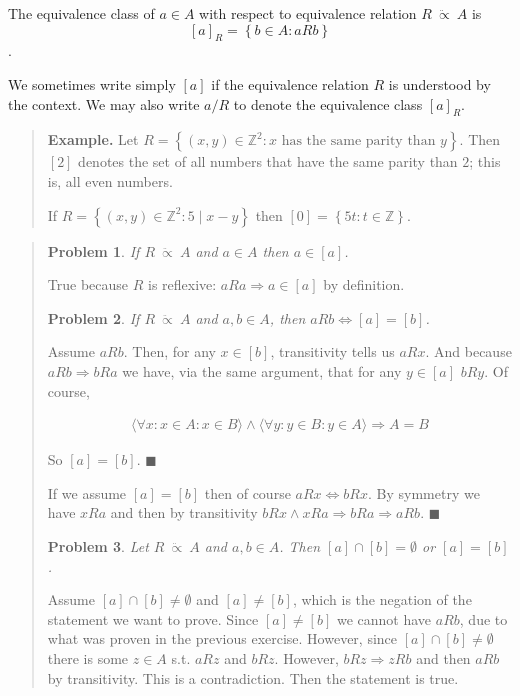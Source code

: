 \documentclass[a4paper, 12pt]{article}
\newtheorem{problem}{Problem}
\newtheorem{problem}{Problem}
\begin{document}
\begin{definition}
    The equivalence class of $a \in A$ with respect to equivalence relation $R ~
    \ddot{\propto} ~A$ is $$[a]_{R} = \left\{ b \in A : aRb \right\} $$.
\end{definition}

We sometimes write simply $[a]$ if the equivalence relation $R$ is understood by
the context. We may also write $a / R$ to denote the equivalence class $[a]_R$.


\small
\begin{quote}

\textbf{Example.} Let $R = \left\{ (x, y) \in \mathbb{Z}^2 : x \text{ has the same parity than }
y\right\} $. Then $[2]$ denotes the set of all numbers that have the same parity
than $2$; this is, all even numbers.

If $R = \left\{ (x, y) \in  \mathbb{Z}^2 : 5 \mid x - y \right\} $ then $[0] =
\left\{ 5t : t \in \mathbb{Z} \right\} $.

\end{quote}
\normalsize


\small
\begin{quote}

\begin{problem}
    If $R ~ \ddot{\propto} ~A$  and $a \in A$ then $a \in [a]$.
\end{problem}

True because $R$ is reflexive: $aRa \Rightarrow a \in [a]$ by definition. 

\begin{problem}
    If $R ~ \ddot{\propto} ~A$ and $a, b \in  A$, then $aRb \iff [a] = [b]$. 
\end{problem}

Assume $aRb$. Then, for any $x \in [b]$, transitivity tells us $aRx$. And
because $aRb \Rightarrow bRa$ we have, via the same argument, that for any $y
\in [a]$ $bRy$. Of course, 

\begin{align*}
    \langle \forall x : x \in A : x \in B \rangle \land \langle \forall y : y
    \in B : y \in A \rangle \Rightarrow A = B
\end{align*}

So $[a] = [b]$. $\blacksquare$

If we assume $[a] = [b]$ then of course $aRx \iff bRx$. By symmetry we have
$xRa$ and then by transitivity $bRx \land xRa \Rightarrow bRa \Rightarrow aRb$.
$\blacksquare$

\begin{problem}
    Let $R ~ \ddot{\propto} ~ A$ and $a, b \in A$. Then $[a] \cap [b] =
    \emptyset$ or $[a] =  [b]$.
\end{problem}

Assume $[a] \cap [b] \neq \emptyset$ and $[a] \neq [b]$, which is the negation
of the statement we want to prove. Since $[a] \neq [b]$ we cannot have $aRb$,
due to what was proven in the previous exercise. However, since $[a] \cap [b]
\neq \emptyset$ there is some $z \in A$ s.t. $aRz$ and $bRz$. However, $bRz
\Rightarrow zRb$ and then $aRb$ by transitivity. This is a contradiction. Then
the statement is true.

\end{quote}
\normalsize
\end{document}
